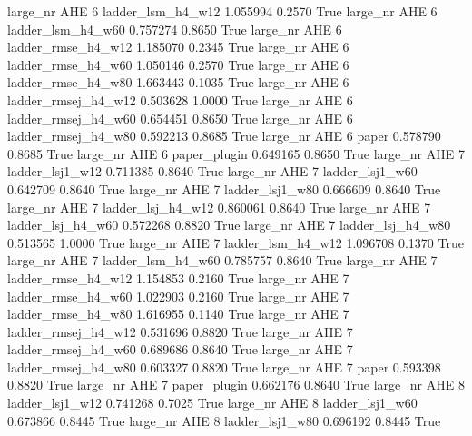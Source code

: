   large_nr      AHE                 6   ladder_lsm_h4_w12    1.055994      0.2570    True
  large_nr      AHE                 6   ladder_lsm_h4_w60    0.757274      0.8650    True
  large_nr      AHE                 6  ladder_rmse_h4_w12    1.185070      0.2345    True
  large_nr      AHE                 6  ladder_rmse_h4_w60    1.050146      0.2570    True
  large_nr      AHE                 6  ladder_rmse_h4_w80    1.663443      0.1035    True
  large_nr      AHE                 6 ladder_rmsej_h4_w12    0.503628      1.0000    True
  large_nr      AHE                 6 ladder_rmsej_h4_w60    0.654451      0.8650    True
  large_nr      AHE                 6 ladder_rmsej_h4_w80    0.592213      0.8685    True
  large_nr      AHE                 6               paper    0.578790      0.8685    True
  large_nr      AHE                 6        paper_plugin    0.649165      0.8650    True
  large_nr      AHE                 7     ladder_lsj1_w12    0.711385      0.8640    True
  large_nr      AHE                 7     ladder_lsj1_w60    0.642709      0.8640    True
  large_nr      AHE                 7     ladder_lsj1_w80    0.666609      0.8640    True
  large_nr      AHE                 7   ladder_lsj_h4_w12    0.860061      0.8640    True
  large_nr      AHE                 7   ladder_lsj_h4_w60    0.572268      0.8820    True
  large_nr      AHE                 7   ladder_lsj_h4_w80    0.513565      1.0000    True
  large_nr      AHE                 7   ladder_lsm_h4_w12    1.096708      0.1370    True
  large_nr      AHE                 7   ladder_lsm_h4_w60    0.785757      0.8640    True
  large_nr      AHE                 7  ladder_rmse_h4_w12    1.154853      0.2160    True
  large_nr      AHE                 7  ladder_rmse_h4_w60    1.022903      0.2160    True
  large_nr      AHE                 7  ladder_rmse_h4_w80    1.616955      0.1140    True
  large_nr      AHE                 7 ladder_rmsej_h4_w12    0.531696      0.8820    True
  large_nr      AHE                 7 ladder_rmsej_h4_w60    0.689686      0.8640    True
  large_nr      AHE                 7 ladder_rmsej_h4_w80    0.603327      0.8820    True
  large_nr      AHE                 7               paper    0.593398      0.8820    True
  large_nr      AHE                 7        paper_plugin    0.662176      0.8640    True
  large_nr      AHE                 8     ladder_lsj1_w12    0.741268      0.7025    True
  large_nr      AHE                 8     ladder_lsj1_w60    0.673866      0.8445    True
  large_nr      AHE                 8     ladder_lsj1_w80    0.696192      0.8445    True
